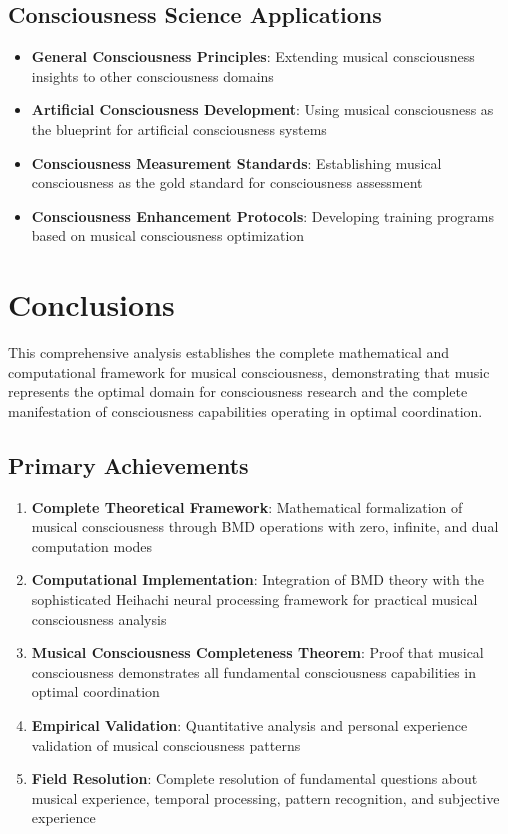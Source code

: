 \documentclass[12pt,a4paper]{article}
\begin{document}
\subsection{Consciousness Science Applications}

\begin{itemize}
\item \textbf{General Consciousness Principles}: Extending musical consciousness insights to other consciousness domains
\item \textbf{Artificial Consciousness Development}: Using musical consciousness as the blueprint for artificial consciousness systems
\item \textbf{Consciousness Measurement Standards}: Establishing musical consciousness as the gold standard for consciousness assessment
\item \textbf{Consciousness Enhancement Protocols}: Developing training programs based on musical consciousness optimization
\end{itemize}

\section{Conclusions}

This comprehensive analysis establishes the complete mathematical and computational framework for musical consciousness, demonstrating that music represents the optimal domain for consciousness research and the complete manifestation of consciousness capabilities operating in optimal coordination.

\subsection{Primary Achievements}

\begin{enumerate}
\item \textbf{Complete Theoretical Framework}: Mathematical formalization of musical consciousness through BMD operations with zero, infinite, and dual computation modes

\item \textbf{Computational Implementation}: Integration of BMD theory with the sophisticated Heihachi neural processing framework for practical musical consciousness analysis

\item \textbf{Musical Consciousness Completeness Theorem}: Proof that musical consciousness demonstrates all fundamental consciousness capabilities in optimal coordination

\item \textbf{Empirical Validation}: Quantitative analysis and personal experience validation of musical consciousness patterns

\item \textbf{Field Resolution}: Complete resolution of fundamental questions about musical experience, temporal processing, pattern recognition, and subjective experience
\end{enumerate}
\end{document}
